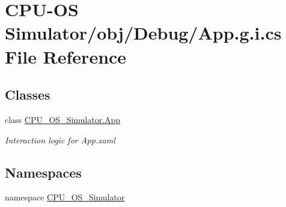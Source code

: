 \hypertarget{_c_p_u-_o_s_01_simulator_2obj_2_debug_2_app_8g_8i_8cs}{}\section{C\+P\+U-\/\+O\+S Simulator/obj/\+Debug/\+App.g.\+i.\+cs File Reference}
\label{_c_p_u-_o_s_01_simulator_2obj_2_debug_2_app_8g_8i_8cs}
\subsection*{Classes}
\begin{DoxyCompactItemize}
\item 
class \hyperlink{class_c_p_u___o_s___simulator_1_1_app}{C\+P\+U\+\_\+\+O\+S\+\_\+\+Simulator.\+App}
\begin{DoxyCompactList}\small\item\em Interaction logic for App.\+xaml \end{DoxyCompactList}\end{DoxyCompactItemize}
\subsection*{Namespaces}
\begin{DoxyCompactItemize}
\item 
namespace \hyperlink{namespace_c_p_u___o_s___simulator}{C\+P\+U\+\_\+\+O\+S\+\_\+\+Simulator}
\end{DoxyCompactItemize}
